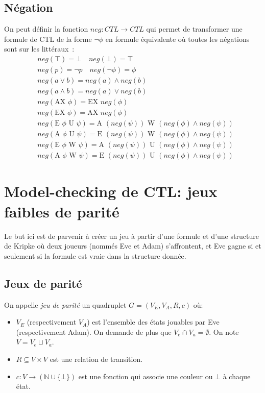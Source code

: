 \documentclass[10pt,a4paper]{article}
\begin{document}
\subsection{Négation}
On peut définir la fonction $neg:CTL \to CTL$ qui permet de transformer une formule de CTL de la forme $\neg \phi$ en formule équivalente où toutes les négations sont sur les littéraux :
\begin{align*}
&neg(\top) = \bot \quad neg(\bot) = \top\\
&neg(p) = \neg p \quad neg(\neg \phi) = \phi\\
&neg(a \lor b) = neg(a) \land neg(b)\\
&neg(a \land b) = neg(a) \lor neg(b)\\
&neg(\mbox{AX } \phi) = \mbox{EX }neg(\phi)\\
&neg(\mbox{EX } \phi) = \mbox{AX }neg(\phi)\\
&neg(\mbox{E } \phi \mbox{ U } \psi) =\mbox{A } (neg(\psi)) \mbox{ W } (neg(\phi) \land neg(\psi))\\
&neg(\mbox{A } \phi \mbox{ U } \psi) =\mbox{E } (neg(\psi)) \mbox{ W } (neg(\phi) \land neg(\psi))\\
&neg(\mbox{E } \phi \mbox{ W } \psi) =\mbox{A } (neg(\psi)) \mbox{ U } (neg(\phi) \land neg(\psi))\\
&neg(\mbox{A } \phi \mbox{ W } \psi) =\mbox{E } (neg(\psi)) \mbox{ U } (neg(\phi) \land neg(\psi))
\end{align*}

\section{Model-checking de CTL: jeux faibles de parité}
Le but ici est de parvenir à créer un jeu à partir d'une formule et d'une structure de Kripke où deux joueurs (nommés Eve et Adam) s'affrontent, et Eve gagne si et seulement si la formule est vraie dans la structure donnée.

\subsection{Jeux de parité}
\label{fpg}
On appelle \emph{jeu de parité} un quadruplet $G = (V_E, V_A, R, c)$ où:
\begin{itemize}
\item $V_E$ (respectivement $V_A$) est l'ensemble des états jouables par Eve (respectivement Adam). On demande de plus que $V_e \cap V_a = \emptyset$. On note $V = V_e \sqcup V_a$.
\item $R \subseteq V \times V$ est une relation de transition.
\item $c : V \to (\mathbb{N} \cup \{\bot\})$ est une fonction qui associe une couleur ou $\bot$ à chaque état.
\end{itemize}
\end{document}
